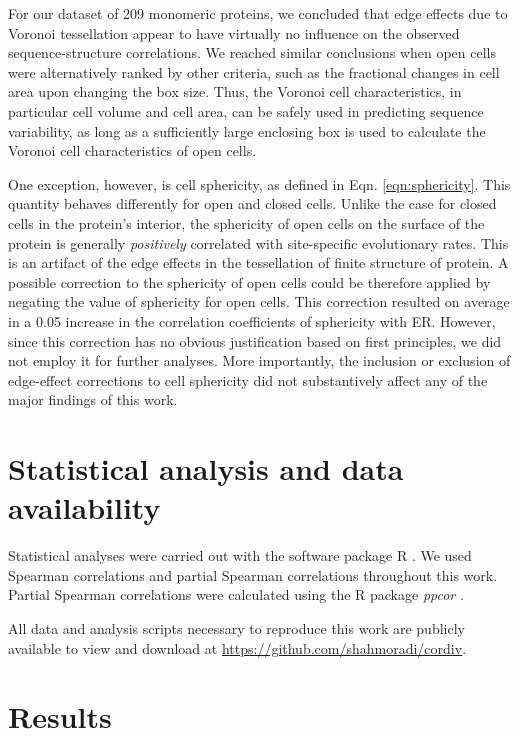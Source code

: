 \documentclass[12pt]{article}
\begin{document}
For our dataset of 209 monomeric proteins, we concluded that edge effects due to Voronoi tessellation appear to have virtually no influence on the observed sequence-structure correlations. We reached similar conclusions when open cells were alternatively ranked by other criteria, such as the fractional changes in cell area upon changing the box size. Thus, the Voronoi cell characteristics, in particular cell volume and cell area, can be safely used in predicting sequence variability, as long as a sufficiently large enclosing box is used to calculate the Voronoi cell characteristics of open cells.

One exception, however, is cell sphericity, as defined in Eqn. \ref{eqn:sphericity}. This quantity behaves differently for open and closed cells. Unlike the case for closed cells in the protein's interior,  the sphericity of open cells on the surface of the protein is generally {\it positively} correlated with site-specific evolutionary rates. This is an artifact of the edge effects in the tessellation of finite structure of protein. A possible correction to the sphericity of open cells could be therefore applied by negating the value of sphericity for open cells. This correction resulted on average in a 0.05 increase in the correlation coefficients of sphericity with ER. However, since this correction has no obvious justification based on first principles, we did not employ it for further analyses. More importantly, the inclusion or exclusion of edge-effect corrections to cell sphericity did not substantively affect any of the major findings of this work.


\section*{Statistical analysis and data availability}  

Statistical analyses were carried out with the software package R \cite{ihaka1998r}. We used Spearman correlations and partial Spearman correlations throughout this work. Partial Spearman correlations were calculated using the R package {\it ppcor} \cite{kim_understanding_2006}.

All data and analysis scripts necessary to reproduce this work are publicly available to view and download at \url{https://github.com/shahmoradi/cordiv}.


\section*{Results}
\end{document}
